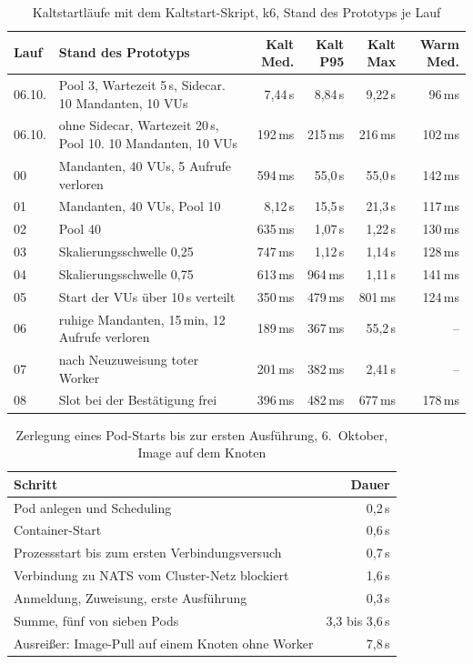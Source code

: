\begin{table}[H]
  \caption{Kaltstartläufe mit dem Kaltstart-Skript, k6, Stand des Prototyps je Lauf}
  \label{tab:kaltstart-verlauf}
  \footnotesize
  \begin{tabularx}{\textwidth}{@{}l >{\RaggedRight\arraybackslash}X r r r r@{}}
    \hline
    Lauf & Stand des Prototyps & Kalt Med. & Kalt P95 & Kalt Max & Warm Med. \\
    \hline
    06.10. & Pool 3, Wartezeit 5\,s, Sidecar. 10 Mandanten, 10 \acsp{VU} & 7,44\,s & 8,84\,s & 9,22\,s & 96\,ms \\
    06.10. & ohne Sidecar, Wartezeit 20\,s, Pool 10. 10 Mandanten, 10 \acsp{VU} & 192\,ms & 215\,ms & 216\,ms & 102\,ms \\
    00 & 10 Mandanten, 40 \acsp{VU}, 5 Aufrufe verloren & 594\,ms & 55,0\,s & 55,0\,s & 142\,ms \\
    01 & 33 Mandanten, 40 \acsp{VU}, Pool 10 & 8,12\,s & 15,5\,s & 21,3\,s & 117\,ms \\
    02 & Pool 40 & 635\,ms & 1,07\,s & 1,22\,s & 130\,ms \\
    03 & Skalierungsschwelle 0,25 & 747\,ms & 1,12\,s & 1,14\,s & 128\,ms \\
    04 & Skalierungsschwelle 0,75 & 613\,ms & 964\,ms & 1,11\,s & 141\,ms \\
    05 & Start der \acsp{VU} über 10\,s verteilt & 350\,ms & 479\,ms & 801\,ms & 124\,ms \\
    06 & ruhige Mandanten, 15\,min, 12 Aufrufe verloren & 189\,ms & 367\,ms & 55,2\,s & -- \\
    07 & nach Neuzuweisung toter Worker & 201\,ms & 382\,ms & 2,41\,s & -- \\
    08 & Slot bei der Bestätigung frei & 396\,ms & 482\,ms & 677\,ms & 178\,ms \\
    \hline
  \end{tabularx}
\end{table}

\begin{table}[H]
  \caption{Zerlegung eines Pod-Starts bis zur ersten Ausführung, 6.\ Oktober, Image auf dem Knoten}
  \label{tab:podstart}
  \small
  \begin{tabularx}{\textwidth}{@{}>{\RaggedRight\arraybackslash}X r@{}}
    \hline
    Schritt & Dauer \\
    \hline
    Pod anlegen und Scheduling & 0,2\,s \\
    Container-Start & 0,6\,s \\
    Prozessstart bis zum ersten Verbindungsversuch & 0,7\,s \\
    Verbindung zu NATS vom Cluster-Netz blockiert & 1,6\,s \\
    Anmeldung, Zuweisung, erste Ausführung & 0,3\,s \\
    Summe, fünf von sieben Pods & 3,3 bis 3,6\,s \\
    Ausreißer: Image-Pull auf einem Knoten ohne Worker & 7,8\,s \\
    \hline
  \end{tabularx}
\end{table}


